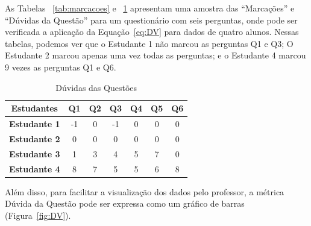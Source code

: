 As Tabelas ~\ref{tab:marcacoes} e ~\ref{tab:duvidas-questao} apresentam uma amostra das ``Marcações'' e ``Dúvidas da Questão'' para um questionário com seis perguntas, onde pode ser verificada a aplicação da Equação~\ref{eq:DV} para dados de quatro alunos. Nessas tabelas, podemos ver que o Estudante 1 não marcou as perguntas Q1 e Q3; O Estudante 2 marcou apenas uma vez todas as perguntas; e o Estudante 4 marcou 9 vezes as perguntas Q1 e Q6.

\begin{table}[htbp]
\caption{Dúvidas das Questões}
\begin{center}
\begin{tabular}{|c|c|c|c|c|c|c|}
\hline
\textbf{Estudantes} & \textbf{Q1} & \textbf{Q2} & \textbf{Q3} & \textbf{Q4} & \textbf{Q5} & \textbf{Q6} \\ \hline
\textbf{Estudante 1} & -1 & 0 & -1 & 0 & 0 & 0 \\ \hline
\textbf{Estudante 2} & 0 & 0 & 0 & 0 & 0 & 0 \\ \hline
\textbf{Estudante 3} & 1 & 3 & 4 & 5 & 7 & 0 \\ \hline
\textbf{Estudante 4} & 8 & 7 & 5 & 5 & 6 & 8 \\ \hline
\end{tabular}
\end{center}
\label{tab:duvidas-questao}
\end{table}

Além disso, para facilitar a visualização dos dados pelo professor, a métrica Dúvida da Questão pode ser expressa como um gráfico de barras (Figura~\ref{fig:DV}).

